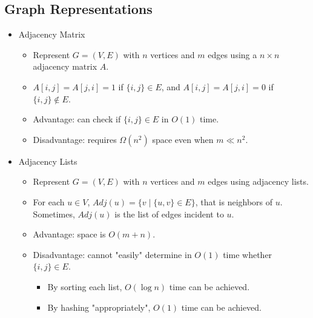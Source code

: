 \subsection{Graph Representations}
\begin{itemize}
    \item Adjacency Matrix
    \begin{itemize}
        \item Represent $G = (V, E)$ with $n$ vertices and $m$ edges using a $n \times n$ adjacency matrix $A$.
        \item $A[i, j] = A[j, i] = 1$ if $\{ i , j \} \in E$, and $A[i, j] = A[j, i] = 0$ if $\{ i, j \} \notin E$.
        \item Advantage: can check if $\{ i, j \} \in E$ in $O(1)$ time.
        \item Disadvantage: requires $\Omega(n^2)$ space even when $m \ll n^2$.
    \end{itemize}
    \item Adjacency Lists
    \begin{itemize}
        \item Represent $G = (V, E)$ with $n$ vertices and $m$ edges using adjacency lists.
        \item For each $u \in V$, $Adj(u) = \{ v \mid \{ u, v \} \in E \}$, that is neighbors of $u$. Sometimes, $Adj(u)$ is the list of edges incident to $u$.
        \item Advantage: space is $O(m + n)$.
        \item Disadvantage: cannot "easily" determine in $O(1)$ time whether $\{ i, j \} \in E$.
        \begin{itemize}
            \item By sorting each list, $O(\log n)$ time can be achieved.
            \item By hashing "appropriately", $O(1)$ time can be achieved.
        \end{itemize}
    \end{itemize}
\end{itemize}

